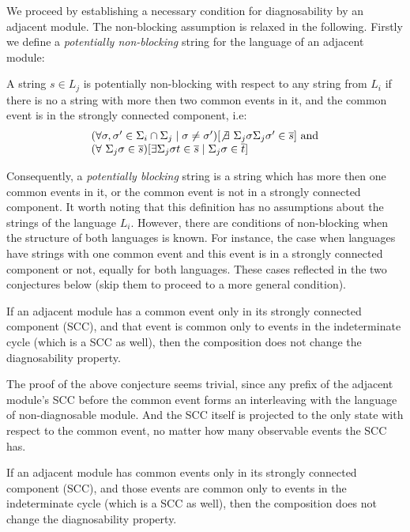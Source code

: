 \documentclass[a4paper, 10pt, conference]{ieeeconf}
\begin{document}
We proceed by establishing a necessary condition for diagnosability by an
adjacent module. The non-blocking assumption is relaxed in the following.
Firstly we define a \emph{potentially non-blocking} string for the language of
an adjacent module:

\begin{definition} A string $s \in L_j$ is potentially non-blocking with respect
to any string from $L_i$ if there is no a string with more then two common events
in it, and the common event is in the strongly connected component, i.e:
$$
\begin{array}{l}
	(\forall \sigma, \sigma' \in \Sigma_i \cap \Sigma_j \mid \sigma \neq
	\sigma') 
	[\not \exists ~\Sigma_j \sigma \Sigma_j \sigma' \in \overline{s}]
	\textrm{ and} \\
	(\forall ~\Sigma_j \sigma \in \overline{s}) 
	[\exists \Sigma_j \sigma t \in \overline{s} \mid \Sigma_j \sigma \in \overline{t}]
	
\end{array}
$$
\end{definition}
Consequently, a \emph{potentially blocking} string is a string which has more
then one common events in it, or the common event is not in a strongly connected
component. It worth noting that this definition has no assumptions about the
strings of the language $L_i$. However, there are conditions of non-blocking
when the structure of both languages is known. For instance, the case when 
languages have strings with one common event and this event is in a strongly
connected component or not, equally for both languages. These cases reflected in
the two conjectures below (skip them to proceed to a more general condition).

\begin{conjecture} If an adjacent module has a
common event only in its strongly connected component (SCC), and that event is
common only to events in the indeterminate cycle (which is a SCC as well), then
the composition does not change the diagnosability property.
\end{conjecture} 

The proof of the above conjecture seems trivial, since any prefix of the
adjacent module's SCC before the common event forms an interleaving with the
language of non-diagnosable module. And the SCC itself is projected to the only
state with respect to the common event, no matter how many observable
events the SCC has.

\begin{conjecture} If an adjacent module has 
common events only in its strongly connected component (SCC), and those events
are common only to events in the indeterminate cycle (which is a SCC as well),
then the composition does not change the diagnosability property.
\end{conjecture}
\end{document}
